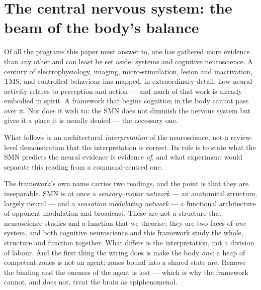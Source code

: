 \documentclass{article}
\begin{document}
\section{The central nervous system: the beam of the body's balance}\label{sec:neuro}

Of all the programs this paper must answer to, one has gathered more
evidence than any other and can least be set aside: systems and cognitive
neuroscience.  A century of electrophysiology, imaging, micro-stimulation,
lesion and inactivation, TMS, and controlled behaviour has mapped, in
extraordinary detail, how neural activity relates to perception and action
--- and much of that work is already embodied in spirit.  A framework that
begins cognition in the body cannot pass over it.  Nor does it wish to: the
SMN does not diminish the nervous system but gives it a place it is usually
denied --- the necessary one.

What follows is an architectural \emph{interpretation} of the neuroscience, not a
review-level demonstration that the interpretation is correct.  Its role is to
state what the SMN predicts the neural evidence is evidence \emph{of}, and what
experiment would separate this reading from a command-centred one.

The framework's own name carries two readings, and the point is that they
are inseparable.  SMN is at once a \emph{sensory--motor network} --- an
anatomical structure, largely neural --- and a \emph{sensation modulating
network} --- a functional architecture of opponent modulation and
broadcast.  These are not a structure that neuroscience studies and a
function that we theorise; they are two faces of \emph{one} system, and
both cognitive neuroscience and this framework study the whole, structure
and function together.  What differs is the interpretation, not a division
of labour.  And the first thing the wiring does is make the body
\emph{one}: a heap of competent zones is not an agent; zones bound into a
shared state are.  Remove the binding and the oneness of the agent is lost
--- which is why the framework cannot, and does not, treat the brain as
epiphenomenal.
\end{document}
